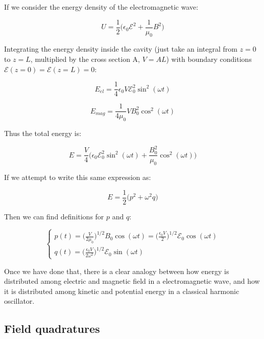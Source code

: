 \documentclass[12pt,a4paper]{report}
\begin{document}
If we consider the energy density of the electromagnetic wave:

\begin{equation}
    U=\frac{1}{2}\Bigg(\epsilon_0\mathcal{E}^2+\frac{1}{\mu_0}B^2\Bigg)
\end{equation}

Integrating the energy density inside the cavity (just take an integral from $z=0$ to $z=L$, multiplied by the cross section A, $V=AL$) with boundary conditions $\mathcal{E}(z=0)=\mathcal{E}(z=L)=0$:

\begin{equation}
    E_{el}=\frac{1}{4}\epsilon_0V\mathcal{E}_0^2\sin^2(\omega t)
\end{equation}

\begin{equation}
    E_{mag}=\frac{1}{4\mu_0}VB_0^2\cos^2(\omega t)
\end{equation}

Thus the total energy is:

\begin{equation}
    \boxed{E=\frac{V}{4}\Bigg(\epsilon_0\mathcal{E}_0^2\sin^2(\omega t)+\frac{B_0^2}{\mu_0}\cos^2(\omega t)\Bigg)}
\end{equation}

If we attempt to write this same expression as:

\begin{equation}
    E=\frac{1}{2}\Big(p^2+\omega^2q\Big)
\end{equation}

Then we can find definitions for $p$ and $q$:

\begin{equation}
    \begin{cases}
        p(t)=\Big(\frac{V}{2\mu_0}\Big)^{1/2}B_0\cos(\omega t)=\Big(\frac{\epsilon_0V}{2}\Big)^{1/2}\mathcal{E}_0\cos(\omega t)\\[0.3cm]
        q(t)=\Big(\frac{\epsilon_0V}{2\omega^2}\Big)^{1/2}\mathcal{E}_0\sin(\omega t)
    \end{cases}
\end{equation}

Once we have done that, there is a clear analogy between how energy is distributed among electric and magnetic field in a electromagnetic wave, and how it is distributed among kinetic and potential energy in a classical harmonic oscillator.

\subsection{Field quadratures}
\end{document}
